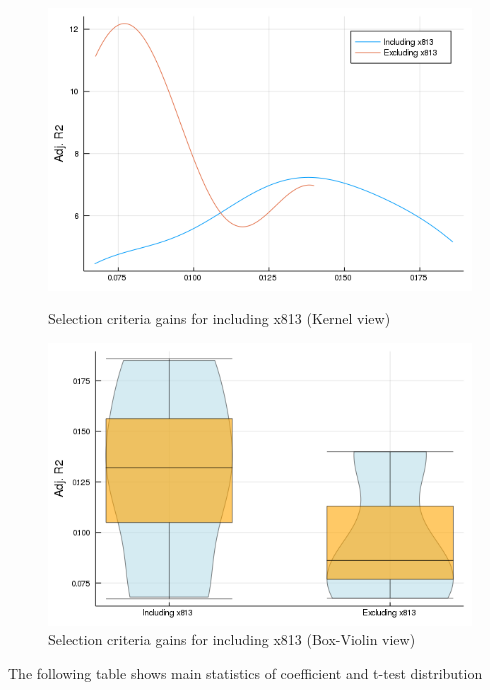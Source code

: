 \documentclass{article}
\begin{document}
\begin{figure}[!ht]
  \begin{minipage}[b]{0.48\textwidth}
    \centering
    \includegraphics[width=\textwidth]{Kdensity_criteria_x813.png}
    \caption{Selection criteria gains for including x813 (Kernel view)}
  \end{minipage}
  \hfill
  \begin{minipage}[b]{0.48\textwidth}
    \centering    
    \includegraphics[width=\textwidth]{BoxViolinDot_x813.png}
    \caption{Selection criteria gains for including x813 (Box-Violin view)}    
  \end{minipage}
\end{figure}

\vspace{1cm}

The following table shows main statistics of coefficient and t-test distribution 
\end{document}
